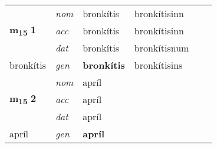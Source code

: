 \begin{longtable}[l]{X>{\footnotesize\itshape}XXXXX}
\multirow{3}{*}{{{\textbf{m{\textsubscript{15}}} \Large{\textbf{1}}}}} & nom & bronkítis & bronkítisinn & \textbf{} &  \\*
 & acc & bronkítis & bronkítisinn &  &  \\*
 & dat & bronkítis & bronkítisnum &  &  \\*
 {\footnotesize{bronkítis}} & gen & \textbf{bronkítis} & bronkítisins &  &  \\
\cmidrule{1-6}

\multirow{3}{*}{{{\textbf{m{\textsubscript{15}}} \Large{\textbf{2}}}}} & nom & apríl &  & \textbf{} &  \\*
 & acc & apríl &  &  &  \\*
 & dat & apríl &  &  &  \\*
 {\footnotesize{apríl}} & gen & \textbf{apríl} &  &  &  \\
\bottomrule
\end{longtable}
